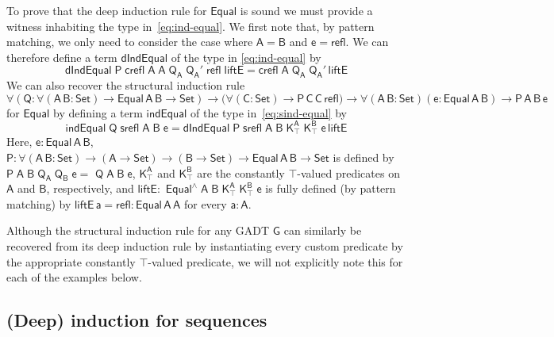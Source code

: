 \documentclass[9pt]{entcs}
\begin{document}
To prove that the deep induction rule for $\mathsf{Equal}$ is sound we
must provide a witness inhabiting the type in~\eqref{eq:ind-equal}.
We first note that, by {\color{red} pattern matching}, we only need to
consider the case where $\mathsf{A} = \mathsf{B}$ and $\mathsf{e} =
\mathsf{refl}$.  We can therefore define a term $\mathsf{dIndEqual}$
of the type in \eqref{eq:ind-equal} by
\[\mathsf{dIndEqual\;P\;crefl\;A\;A\;Q_A\;Q_A'\;refl\;liftE =
  crefl\;A\;Q_A\;Q_A'\,liftE}\] 
We can also recover the structural induction rule
\begin{equation}\label{eq:sind-equal}
\mathsf{\forall (Q : \forall (A\,B : Set)
  \to Equal\,A\,B \to Set) \to \big( \forall (C : Set) \to
  P\,C\,C\,refl \big) \to \forall (A\,B : Set) (e: Equal\,A\,B) \to
  P\,A\,B\,e}
\end{equation}
for $\mathsf{Equal}$ by defining a term $\mathsf{indEqual}$ of the
type in~\eqref{eq:sind-equal} by
\[\mathsf{indEqual\;Q\;srefl\;A\;B\;e =
  dIndEqual\;P\;srefl\;A\;B\;K^A_\top\;K^B_\top\;e\,liftE}\] Here,
$\mathsf{e : Equal\,A\,B}$,
$\mathsf{P : \forall (A\,B : Set) \to (A \to Set) \to (B \to
  Set) \to Equal\,A\,B \to Set}$ is defined by
  $\mathsf{P\;A\;B\;Q_A\;Q_B\;e =}$ $\mathsf{Q\;A\;B\;e}$,
$\mathsf{K^A_\top}$ and $\mathsf{K^B_\top}$ are the constantly
  {\color{red} $\mathsf{\top}$}-valued predicates on $\mathsf{A}$ and
  $\mathsf{B}$, respectively, and
$\mathsf{liftE :}$ $\mathsf{Equal^{\wedge}\;A\;B\;K^A_\top\;K^B_\top\;e}$
  is fully defined (by pattern matching) by $\mathsf{liftE\,a = refl :
    Equal\,A\,A}$ for every $\mathsf{a : A}$.


{\color{red} Although the structural induction rule for any GADT
  $\mathsf{G}$ can similarly be recovered from its deep induction rule
  by instantiating every custom predicate by the appropriate
  constantly {\color{red}$\mathsf{\top}$}-valued predicate, we will
  not explicitly note this for each of the examples below.}

\subsection{(Deep) induction for sequences}\label{sec:ind-seq}
\end{document}
